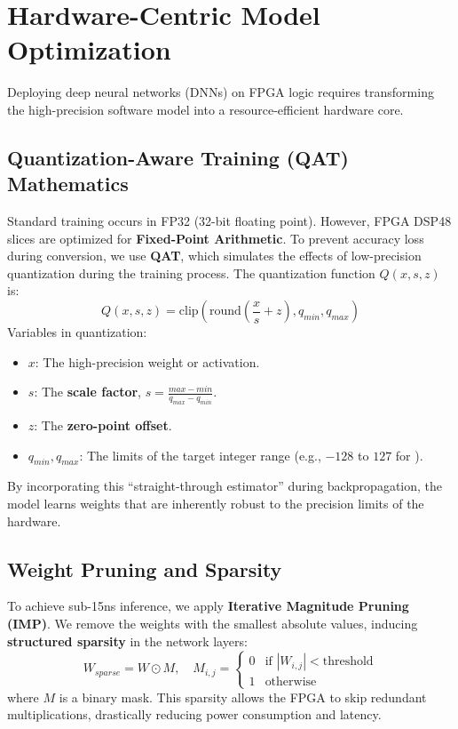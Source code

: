 \section{Hardware-Centric Model Optimization}
Deploying deep neural networks (DNNs) on FPGA logic requires transforming the high-precision software model into a resource-efficient hardware core.

\subsection{Quantization-Aware Training (QAT) Mathematics}
Standard training occurs in FP32 (32-bit floating point). However, FPGA DSP48 slices are optimized for \textbf{Fixed-Point Arithmetic}. To prevent accuracy loss during conversion, we use \textbf{QAT}, which simulates the effects of low-precision quantization during the training process. The quantization function $Q(x, s, z)$ is:
\begin{equation}
    Q(x, s, z) = \text{clip}\left(\text{round}\left(\frac{x}{s} + z\right), q_{min}, q_{max}\right)
\end{equation}
Variables in quantization:
\begin{itemize}
    \item $x$: The high-precision weight or activation.
    \item $s$: The \textbf{scale factor}, $s = \frac{max - min}{q_{max} - q_{min}}$.
    \item $z$: The \textbf{zero-point offset}.
    \item $q_{min}, q_{max}$: The limits of the target integer range (e.g., $-128$ to $127$ for ).
\end{itemize}
By incorporating this ``straight-through estimator'' during backpropagation, the model learns weights that are inherently robust to the precision limits of the hardware.

\subsection{Weight Pruning and Sparsity}
To achieve sub-15ns inference, we apply \textbf{Iterative Magnitude Pruning (IMP)}. We remove the weights with the smallest absolute values, inducing \textbf{structured sparsity} in the network layers:
\begin{equation}
    W_{sparse} = W \odot M, \quad M_{i,j} = \begin{cases} 0 & \text{if } |W_{i,j}| < \text{threshold} \\ 1 & \text{otherwise} \end{cases}
\end{equation}
where $M$ is a binary mask. This sparsity allows the FPGA to skip redundant multiplications, drastically reducing power consumption and latency.

